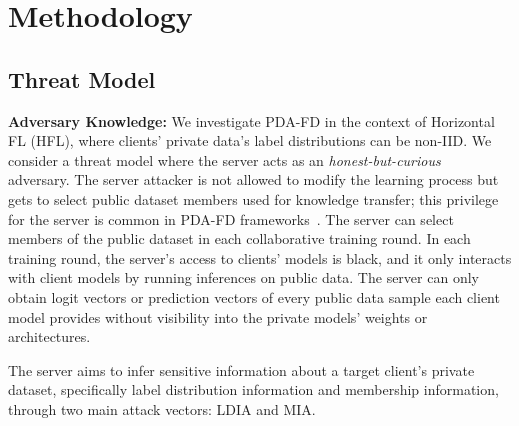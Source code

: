 \section{Methodology}
\label{sec:method}
\subsection{Threat Model}

\textbf{Adversary Knowledge:} We investigate PDA-FD in the context of Horizontal FL (HFL), where clients' private data's label distributions can be non-IID.
We consider a threat model where the server acts as an \textit{honest-but-curious}~\cite{paverd2014modelling} adversary.
The server attacker is not allowed to modify the learning process but gets to select public dataset members used for knowledge transfer; this privilege for the server is common in PDA-FD frameworks~\cite{li2019fedmd, itahara2021distillation, chang2019cronus}. The server can select members of the public dataset in each collaborative training round.
In each training round, the server's access to clients' models is black, and it only interacts with client models by running inferences on public data. The server can only obtain logit vectors or prediction vectors of every public data sample each client model provides without visibility into the private models' weights or architectures.

 The server aims to infer sensitive information about a target client's private dataset, specifically label distribution information and membership information, through two main attack vectors: LDIA and MIA.






